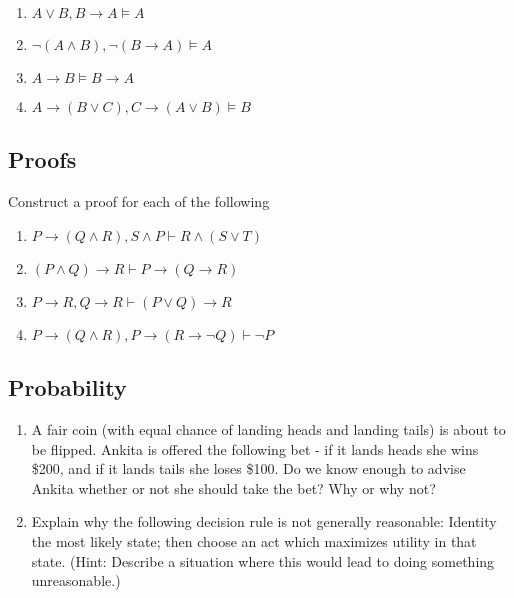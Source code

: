 \documentclass[
  11pt,
]{article}
\providecommand{\tightlist}{%
  \setlength{\itemsep}{0pt}\setlength{\parskip}{0pt}}
\begin{document}
\begin{enumerate}
\def\labelenumi{\arabic{enumi}.}
\setcounter{enumi}{4}
\tightlist
\item
  \(A \vee B, B \rightarrow A \vDash A\)
\item
  \(\neg (A \wedge B), \neg (B \rightarrow A) \vDash A\)
\item
  \(A \rightarrow B \vDash B \rightarrow A\)
\item
  \(A \rightarrow (B \vee C), C \rightarrow (A \vee B) \vDash B\)
\end{enumerate}

\newpage

\hypertarget{proofs}{%
\subsection{Proofs}\label{proofs}}

Construct a proof for each of the following

\begin{enumerate}
\def\labelenumi{\arabic{enumi}.}
\setcounter{enumi}{8}
\tightlist
\item
  \(P \rightarrow (Q \wedge R), S \wedge P \vdash R \wedge (S \vee T)\)
\item
  \((P \wedge Q) \rightarrow R \vdash P \rightarrow (Q \rightarrow R)\)
\item
  \(P \rightarrow R, Q \rightarrow R \vdash (P \vee Q) \rightarrow R\)
\item
  \(P \rightarrow (Q \wedge R), P \rightarrow (R \rightarrow \neg Q) \vdash \neg P\)
\end{enumerate}

\hypertarget{probability}{%
\subsection{Probability}\label{probability}}

\begin{enumerate}
\def\labelenumi{\arabic{enumi}.}
\setcounter{enumi}{12}
\tightlist
\item
  A fair coin (with equal chance of landing heads and landing tails) is
  about to be flipped. Ankita is offered the following bet - if it lands
  heads she wins \$200, and if it lands tails she loses \$100. Do we
  know enough to advise Ankita whether or not she should take the bet?
  Why or why not?
\item
  Explain why the following decision rule is not generally reasonable:
  Identity the most likely state; then choose an act which maximizes
  utility in that state. (Hint: Describe a situation where this would
  lead to doing something unreasonable.)
\end{enumerate}
\end{document}

